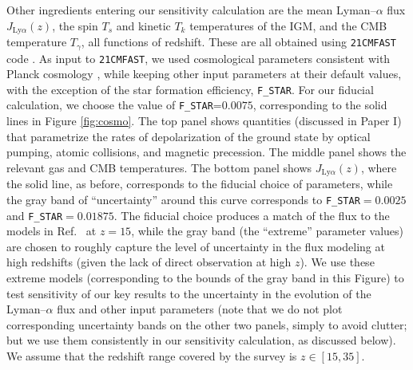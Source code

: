 Other ingredients entering our sensitivity calculation are the mean Lyman--$\alpha$ flux $J_{\text{Ly}\alpha}(z)$, the spin $T_s$ and kinetic $T_k$ temperatures of the IGM, and the CMB temperature $T_\gamma$, all functions of redshift. These are all obtained using \texttt{21CMFAST} code \cite{2011MNRAS.411..955M}. As input to \texttt{21CMFAST}, we used cosmological parameters consistent with Planck cosmology \cite{2015arXiv150201589P}, while keeping other input parameters at their default values, with the exception of the star formation efficiency, \verb|F_STAR|. For our fiducial calculation, we choose the value of \verb|F_STAR|=$0.0075$, corresponding to the solid lines in Figure \ref{fig:cosmo}. The top panel shows quantities (discussed in Paper I) that parametrize the rates of depolarization of the ground state by optical pumping, atomic collisions, and magnetic precession. The middle panel shows the relevant gas and CMB temperatures. The bottom panel shows $J_{\text{Ly}\alpha}(z)$, where the solid line, as before, corresponds to the fiducial choice of parameters, while the gray band of ``uncertainty'' around this curve corresponds to \verb|F_STAR|$=0.0025$ and \verb|F_STAR|$=0.01875$. The fiducial choice produces a match of the flux to the models in Ref.~\cite{2012ApJ...746..125H} at $z=15$, while the gray band (the ``extreme'' parameter values) are chosen to roughly capture the level of uncertainty in the flux modeling at high redshifts (given the lack of direct observation at high $z$). We use these extreme models (corresponding to the bounds of the gray band in this Figure) to test sensitivity of our key results to the uncertainty in the evolution of the Lyman--$\alpha$ flux and other input parameters (note that we do not plot corresponding uncertainty bands on the other two panels, simply to avoid clutter; but we use them consistently in our sensitivity calculation, as discussed below). We assume that the redshift range covered by the survey is $z\in[15,35]$. %


